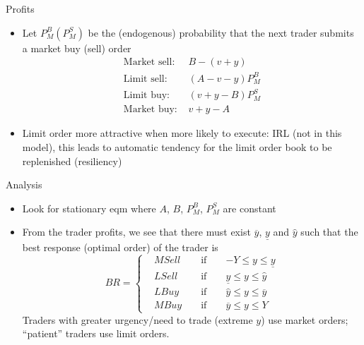 \documentclass[english,10pt
,aspectratio=169
]{beamer}
\begin{document}
\begin{frame}{Profits}
	\begin{itemize}
		\item Let $P^B_M (P^S_M)$ be the (endogenous) probability that the next trader submits a market buy (sell) order 
		\begin{align*}
			\text{Market sell: } & B-(v+y) \\
			\text{Limit sell: } & (A-v-y)P^B_M \\
			\text{Limit buy: } &(v+y-B)P^S_M \\
			\text{Market buy: } &v+y-A
		\end{align*}
		\item Limit order more attractive when more likely to execute: IRL (not in this model), this leads to automatic tendency for the limit order book to be replenished (resiliency)
	\end{itemize}
\end{frame}


\begin{frame}{Analysis}
	\begin{itemize}
		\item Look for stationary eqm where  $A$, $B$, $P^B_M$, $P^S_M$ are constant 
		\item From the trader profits, we see that there must exist $\overline{y}$,  $\underline{y}$ and $\hat{y}$ such that the best response (optimal order) of the trader is
		\begin{equation*}
		BR=\left\{ \begin{aligned}
		&MSell		&& 	\text{ if } 	&&	-Y\le y \le \underline{y} \\
		&LSell 		&&	\text{ if } 	&&	\underline{y} \le y \le \hat{y} \\
		&LBuy		&&	\text{ if } 	&&	\hat{y} \le y \le \overline{y} \\
		&MBuy	&&	\text{ if } 	&&	\overline{y} \le y \le Y
		\end{aligned}
		\right.
		\end{equation*}
		Traders with greater urgency/need to trade (extreme $y$) use market orders; 
		\\
		``patient'' traders use limit orders.
	\end{itemize}
\end{frame}
\end{document}
